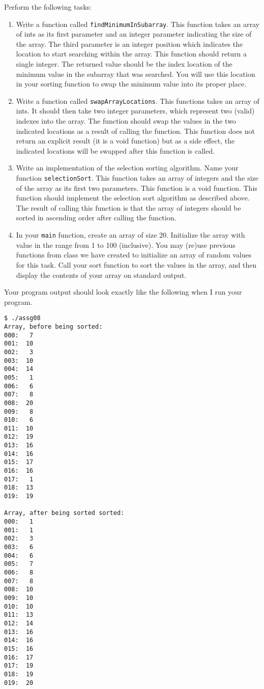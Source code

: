 \documentclass[11pt]{article}
\begin{document}
Perform the following tasks:

\begin{enumerate}
\item Write a function called \verb~findMinimumInSubarray~.  This function
   takes an array of ints as its first parameter and an integer
   parameter indicating the size of the array.  The third parameter is
   an integer position which indicates the location to start searching
   within the array.  This function should return a single integer.
   The returned value should be the index location of the minimum
   value in the subarray that was searched.  You will use this
   location in your sorting function to swap the minimum value into
   its proper place.
\item Write a function called \verb~swapArrayLocations~.  This functions takes
   an array of ints.  It should then take two integer parameters,
   which represent two (valid) indexes into the array.  The function
   should swap the values in the two indicated locations as a result
   of calling the function.  This function does not return an explicit
   result (it is a void function) but as a side effect, the indicated
   locations will be swapped after this function is called.
\item Write an implementation of the selection sorting algorithm.  Name
   your function \verb~selectionSort~.  This function takes an array of
   integers and the size of the array as its first two parameters.
   This function is a void function.  This function should implement
   the selection sort algorithm as described above.  The result of
   calling this function is that the array of integers should be
   sorted in ascending order after calling the function.
\item In your \verb~main~ function, create an array of size 20.  Initialize
   the array with value in the range from 1 to 100 (inclusive).  You
   may (re)use previous functions from class we have created to
   initialize an array of random values for this task.  Call your
   sort function to sort the values in the array, and then display the contents of 
   your array on standard output.
\end{enumerate}

Your program output should look exactly like the following when I run
your program. 


\begin{verbatim}
$ ./assg08
Array, before being sorted:
000:   7
001:  10
002:   3
003:  10
004:  14
005:   1
006:   6
007:   8
008:  20
009:   8
010:   6
011:  10
012:  19
013:  16
014:  16
015:  17
016:  16
017:   1
018:  13
019:  19

Array, after being sorted sorted:
000:   1
001:   1
002:   3
003:   6
004:   6
005:   7
006:   8
007:   8
008:  10
009:  10
010:  10
011:  13
012:  14
013:  16
014:  16
015:  16
016:  17
017:  19
018:  19
019:  20
\end{verbatim}
\end{document}
